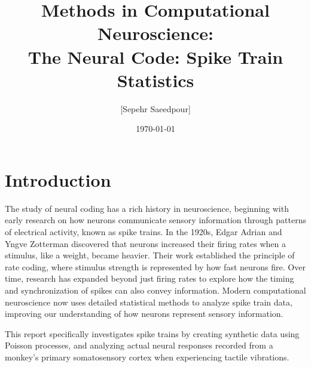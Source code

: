\documentclass{article}
\title{Methods in Computational Neuroscience:\\The Neural Code: Spike Train Statistics}
\author{[Sepehr Saeedpour]}
\date{\today}
\begin{document}
\maketitle



\section*{Introduction}

The study of neural coding has a rich history in neuroscience, beginning with early research on how neurons communicate sensory information through patterns of electrical activity, known as spike trains. In the 1920s, Edgar Adrian and Yngve Zotterman discovered that neurons increased their firing rates when a stimulus, like a weight, became heavier. Their work established the principle of rate coding, where stimulus strength is represented by how fast neurons fire. Over time, research has expanded beyond just firing rates to explore how the timing and synchronization of spikes can also convey information. Modern computational neuroscience now uses detailed statistical methods to analyze spike train data, improving our understanding of how neurons represent sensory information. 

This report specifically investigates spike trains by creating synthetic data using Poisson processes, and analyzing actual neural responses recorded from a monkey’s primary somatosensory cortex when experiencing tactile vibrations.

\end{document}

